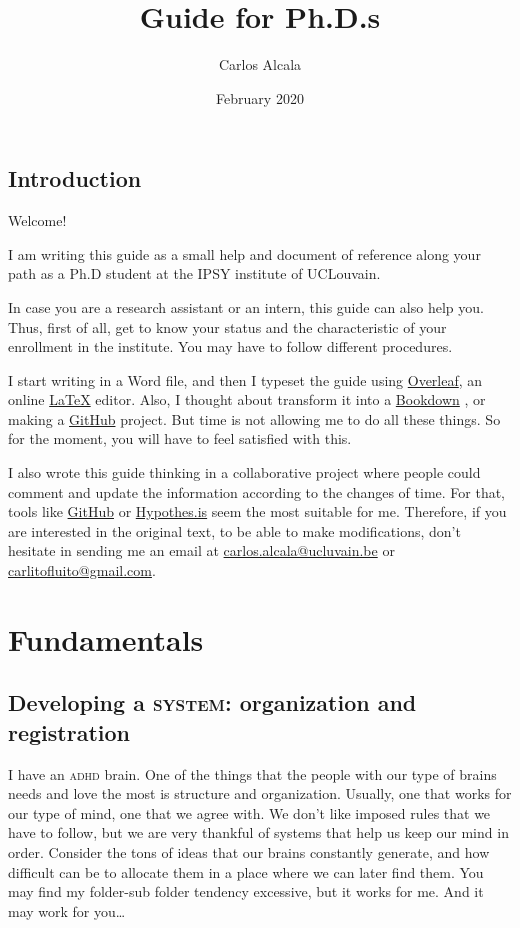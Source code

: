 \documentclass{article}
\title{Guide for Ph.D.s}
\author{Carlos Alcala }
\date{February 2020}
\begin{document}
\maketitle
\tableofcontents

\subsection{Introduction}
\label{subsec: intro}
Welcome!

I am writing this guide as a small help and document of reference along your path as a Ph.D student at the IPSY institute of UCLouvain. 

In case you are a research assistant or an intern, this guide can also help you. Thus, first of all, get to know your status and the characteristic of your enrollment in the institute. You may have to follow different procedures. 

I start writing in a Word file, and then I typeset the guide using \href{https://www.overleaf.com/}{Overleaf}, an online \href{https://www.latex-project.org/}{\LaTeX} editor. Also, I thought about transform it into a \href{https://bookdown.org/}{Bookdown} \citep{xie2016bookdown}, or making a \href{https://github.com/}{GitHub} project. But time is not allowing me to do all these things. So for the moment, you will have to feel satisfied with this.

I also wrote this guide thinking in a collaborative project where people could comment and update the information according to the changes of time. For that, tools like \href{https://github.com/}{GitHub} or \href{https://web.hypothes.is/}{Hypothes.is} seem the most suitable for me. Therefore, if you are interested in the original text, to be able to make modifications, don't hesitate in sending me an email at \href{mailto: carlos.alcala@ucluvain.be}{carlos.alcala@ucluvain.be} or \href{mailto: carlitofluito@gmail.com}{carlitofluito@gmail.com}.


\section{Fundamentals}
\label{sec:Fundament}
\subsection{Developing a \textsc{system}: organization and registration}
\label{subsec: System}

I have an \textsc{adhd} brain. One of the things that the people with our type of brains needs and love the most is structure and organization. Usually, one that works for our type of mind, one that we agree with. We don’t like imposed rules that we have to follow, but we are very thankful of systems that help us keep our mind in order. Consider the tons of ideas that our brains constantly generate, and how difficult can be to allocate them in a place where we can later find them. You may find my folder-sub folder tendency excessive, but it works for me. And it may work for you…
\end{document}
